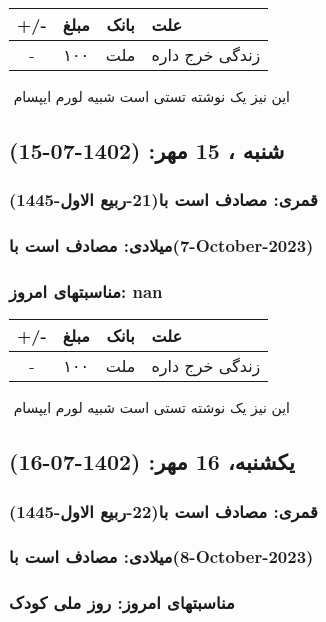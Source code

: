 \documentclass{article}
\newcommand{\rnote}[1]{\marginpar{\textcolor{color}{\StrSubstitute{\##1}{ }{\_}}}}
\newcommand{\myRow}[4]{
    #1 & #2 & #3 & #4 \\ \hline
}
\begin{document}
\begin{tabular}{ | c | c | c | p{5cm} |}
    \hline
    \myRow{ +/- }{مبلغ}{بانک}{علت}
    \myRow{-}{۱۰۰}{ملت}{زندگی خرج داره}
\end{tabular}
\newline
\newline

‌
\rnote{تست}
این نیز یک نوشته تستی است شبیه لورم ایپسام




\newpage
{}
\textcolor{color}{
\section{ شنبه ، 15 مهر: (1402-07-15) }
\subsubsection*{قمری: مصادف است با(21-ربیع الاول-1445)} 
\subsubsection*{میلادی: مصادف است با(7-October-2023)}
\subsubsection*{مناسبتهای امروز: nan}
}


\begin{tabular}{ | c | c | c | p{5cm} |}
    \hline
    \myRow{ +/- }{مبلغ}{بانک}{علت}
    \myRow{-}{۱۰۰}{ملت}{زندگی خرج داره}
\end{tabular}
\newline
\newline

‌
\rnote{تست}
این نیز یک نوشته تستی است شبیه لورم ایپسام




\newpage
{}
\textcolor{color}{
\section{ یکشنبه، 16 مهر: (1402-07-16) }
\subsubsection*{قمری: مصادف است با(22-ربیع الاول-1445)} 
\subsubsection*{میلادی: مصادف است با(8-October-2023)}
\subsubsection*{مناسبتهای امروز: روز ملی کودک}
}
\end{document}
